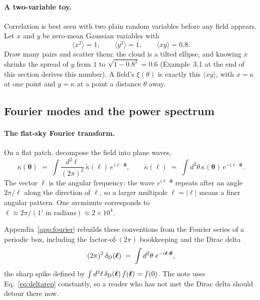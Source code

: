 \documentclass[11pt]{article}
\newcommand{\btheta}{\boldsymbol{\theta}}
\newcommand{\bell}{\boldsymbol{\ell}}
\numberwithin{equation}{section}
\begin{document}
\paragraph{A two-variable toy.}
Correlation is best seen with two plain random variables before any
field appears.  Let $x$ and $y$ be zero-mean Gaussian variables with
\begin{equation}
  \langle x^2 \rangle = 1, \qquad
  \langle y^2 \rangle = 1, \qquad
  \langle x y \rangle = 0.8 .
  \label{eq:toyxy}
\end{equation}
Draw many pairs and scatter them: the cloud is a tilted ellipse, and
knowing $x$ shrinks the spread of $y$ from $1$ to
$\sqrt{1 - 0.8^2} = 0.6$ (Example~3.1 at the end of this section
derives this number).  A field's $\xi(\theta)$ is exactly this
$\langle xy\rangle$, with $x = \kappa$ at one point and $y = \kappa$
at a point a distance $\theta$ away.

\subsection{Fourier modes and the power spectrum}
\label{sec:power}

\paragraph{The flat-sky Fourier transform.}
On a flat patch, decompose the field into plane waves,
\begin{equation}
  \kappa(\btheta) \;=\;
  \int \frac{d^2\ell}{(2\pi)^2}\,
  \tilde\kappa(\bell)\, e^{\,i \bell\cdot\btheta},
  \qquad
  \tilde\kappa(\bell) \;=\;
  \int d^2\theta\, \kappa(\btheta)\, e^{-i \bell\cdot\btheta}.
  \label{eq:fourier}
\end{equation}
The vector $\bell$ is the angular frequency: the wave
$e^{i\bell\cdot\btheta}$ repeats after an angle $2\pi/\ell$ along the
direction of $\bell$, so a larger multipole $\ell = |\bell|$ means a
finer angular pattern.  One arcminute corresponds to
$\ell \approx 2\pi/(1' \text{ in radians}) \approx 2\times 10^4$.

Appendix~\ref{app:fourier} rebuilds these conventions from the
Fourier series of a periodic box, including the factor-of-$(2\pi)$
bookkeeping and the Dirac delta
\begin{equation}
  (2\pi)^2\,\delta_{\rm D}(\bell)
  \;=\; \int d^2\theta\; e^{-i\bell\cdot\btheta},
  \label{eq:deltarep}
\end{equation}
the sharp spike defined by
$\int d^2\ell\, \delta_{\rm D}(\bell)\, f(\bell) = f(0)$.  The note
uses Eq.~\eqref{eq:deltarep} constantly, so a reader who has not met
the Dirac delta should detour there now.
\end{document}
